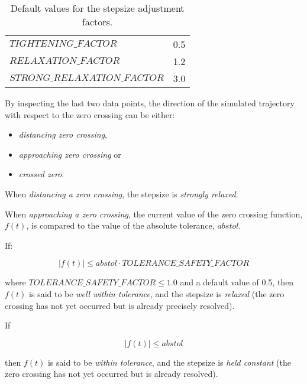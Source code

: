 \begin{table}[h!]
\begin{center}
\caption{Default values for the stepsize adjustment factors.}
\label{tab:defvalsizeadjfactors}
\begin{tabular}{ l l }
	\hline
  $TIGHTENING\_FACTOR$ & 0.5 \\
  $RELAXATION\_FACTOR$ & 1.2 \\
  $STRONG\_RELAXATION\_FACTOR$ & 3.0 \\
	\hline
\end{tabular}
\end{center}
\end{table}

\noindent By inspecting the last two data points, the direction of the simulated trajectory with respect to the zero crossing can be either:

\begin{itemize}
	\item	\textit{distancing zero crossing},
	\item \textit{approaching zero crossing} or
	\item \textit{crossed zero}.
\end{itemize}

\noindent When \textit{distancing a zero crossing}, the stepsize is \textit{strongly relaxed}.

\noindent When \textit{approaching a zero crossing}, the current value of the zero crossing function, $f(t)$, is compared to the value of the absolute tolerance, $abstol$.

\noindent If:

\begin{equation}
|f(t)| \leq abstol \cdot TOLERANCE\_SAFETY\_FACTOR
\end{equation}

\noindent where $TOLERANCE\_SAFETY\_FACTOR \leq 1.0$ and a default value of 0.5, then $f(t)$ is said to be \textit{well within tolerance}, and the stepsize is \textit{relaxed} (the zero crossing has not yet occurred but is already precisely resolved).

\noindent If

\begin{equation}
|f(t)| \leq abstol
\end{equation}

\noindent then $f(t)$ is said to be \textit{within tolerance}, and the stepsize is \textit{held constant} (the zero crossing has not yet occurred but is already resolved).

